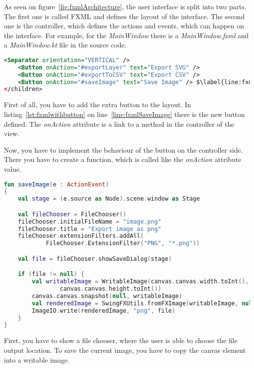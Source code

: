 As seen on figure~\ref{fig:fxmlArchitecture}, the user interface is split into two parts. The first one is called FXML and defines the layout of the interface. The second one is the controller, which defines the actions and events, which can happen on the interface. For example, for the \textit{MainWindow} there is a \textit{MainWindow.fxml} and a \textit{MainWindow.kt} file in the source code.

\begin{lstlisting}[caption={MainWindow.fxml with new button.}, label={lst:fxmlwithbutton}, language=XML, escapechar=$]
    <Separator orientation="VERTICAL" />
    <Button onAction="#exportLayer" text="Export SVG" />
    <Button onAction="#exportToCSV" text="Export CSV" />
    <Button onAction="#saveImage" text="Save Image" /> $\label{line:fxmlSaveImage}$
</children>
\end{lstlisting}

First of all, you have to add the extra button to the layout. In listing~\ref{lst:fxmlwithbutton} on line~\ref{line:fxmlSaveImage} there is the new button defined. The \textit{onAction} attribute is a link to a method in the controller of the view.

Now, you have to implement the behaviour of the button on the controller side. There you have to create a function, which is called like the \textit{onAction} attribute value.

\begin{lstlisting}[caption={Save image controller code.}, label={lst:saveImage}, language=Kotlin, escapechar=$]
fun saveImage(e : ActionEvent)
{
    val stage = (e.source as Node).scene.window as Stage

    val fileChooser = FileChooser()
    fileChooser.initialFileName = "image.png"
    fileChooser.title = "Export image as png"
    fileChooser.extensionFilters.addAll(
            FileChooser.ExtensionFilter("PNG", "*.png"))

    val file = fileChooser.showSaveDialog(stage)

    if (file != null) {
        val writableImage = WritableImage(canvas.canvas.width.toInt(),
                canvas.canvas.height.toInt())
        canvas.canvas.snapshot(null, writableImage)
        val renderedImage = SwingFXUtils.fromFXImage(writableImage, null)
        ImageIO.write(renderedImage, "png", file)
    }
}
\end{lstlisting}

First, you have to show a file chooser, where the user is able to choose the file output location. To save the current image, you have to copy the canvas element into a writable image.


